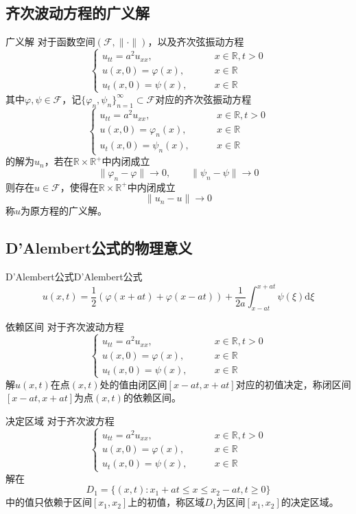 \documentclass[lang = cn, scheme = chinese, thmcnt = section]{elegantbook}
\newcommand{\R}{\mathbb{R}}            %
\newcommand{\sub}{\subset}             %
\newcommand{\dd}{\mathrm{d}}           %
\begin{document}
\subsection{齐次波动方程的广义解}

\begin{definition}{广义解}
	对于函数空间$(\mathscr{F},\|\cdot\|)$，以及齐次弦振动方程%
	$$
	\begin{cases}
		u_{tt}=a^2u_{xx},\qquad & x\in \R,t>0\\
		u(x,0)=\varphi(x),\qquad & x\in \R\\
		u_t(x,0)=\psi(x),\qquad & x\in \R
	\end{cases}
	$$
	其中$\varphi,\psi\in \mathscr{F}$，记$\{ \varphi_n,\psi_n \}_{n=1}^{\infty}\sub\mathscr{F}$对应的齐次弦振动方程%
	$$
	\begin{cases}
		u_{tt}=a^2u_{xx},\qquad & x\in \R,t>0\\
		u(x,0)=\varphi_n(x),\qquad & x\in \R\\
		u_t(x,0)=\psi_n(x),\qquad & x\in \R
	\end{cases}
	$$
	的解为$u_n$，若在$\R\times\R^+$中内闭成立
	$$
	\|\varphi_n-\varphi\|\to0,\qquad \|\psi_n-\psi\|\to 0
	$$
	则存在$u\in \mathscr{F}$，使得在$\R\times\R^+$中内闭成立%
	$$
	\|u_n-u\|\to 0
	$$
	称$u$为原方程的广义解。
\end{definition}

\subsection{D'Alembert公式的物理意义}

\begin{definition}{D'Alembert公式}{D'Alembert公式}
	$$
	u(x,t)=\frac{1}{2}(\varphi(x+at)+\varphi(x-at))+\frac{1}{2a}\int_{x-at}^{x+at}\psi(\xi)\dd\xi
	$$
\end{definition}

\begin{definition}{依赖区间}
	对于齐次波动方程
	$$
	\begin{cases}
		u_{tt}=a^2u_{xx},\qquad & x\in \R,t>0\\
		u(x,0)=\varphi(x),\qquad & x\in \R\\
		u_t(x,0)=\psi(x),\qquad & x\in \R
	\end{cases}
	$$
	解$u(x,t)$在点$(x,t)$处的值由闭区间$[x-at,x+at]$对应的初值决定，称闭区间$[x-at,x+at]$为点$(x,t)$的依赖区间。
\end{definition}

\begin{definition}{决定区域}
	对于齐次波方程
	$$
	\begin{cases}
		u_{tt}=a^2u_{xx},\qquad & x\in \R,t>0\\
		u(x,0)=\varphi(x),\qquad & x\in \R\\
		u_t(x,0)=\psi(x),\qquad & x\in \R
	\end{cases}
	$$
	解在%
	$$
	D_1=\{ (x,t):x_1+at\le x \le x_2-at,t\ge 0 \}
	$$
	中的值只依赖于区间$[x_1,x_2]$上的初值，称区域$D_1$为区间$[x_1,x_2]$的决定区域。
\end{definition}
\end{document}
